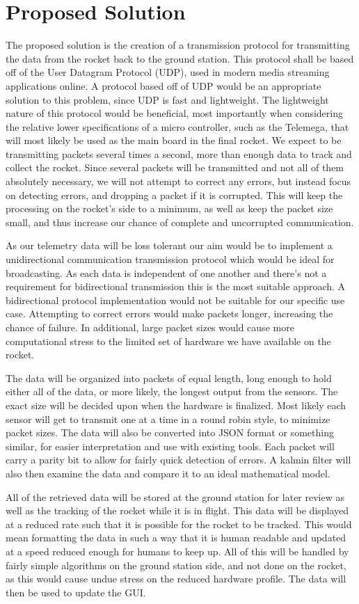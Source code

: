 \documentclass[onecolumn, draftclsnofoot,10pt, compsoc]{IEEEtran}
\begin{document}
\section{Proposed Solution}
The proposed solution is the creation of a transmission protocol for transmitting the data from the rocket back to the ground station. This protocol shall be based off of the User Datagram Protocol (UDP), used in modern media streaming applications online. A protocol based off of UDP would be an appropriate solution to this problem, since UDP is fast and lightweight. The lightweight nature of this protocol would be beneficial, most importantly when considering the relative lower specifications of a micro controller, such as the Telemega, that will most likely be used as the main board in the final rocket. We expect to be transmitting packets several times a second, more than enough data to track and collect the rocket. Since several packets will be transmitted and not all of them absolutely necessary, we will not attempt to correct any errors, but instead focus on detecting errors, and dropping a packet if it is corrupted. This will keep the processing on the rocket’s side to a minimum, as well as keep the packet size small, and thus increase our chance of complete and uncorrupted communication.  \par
As our telemetry data will be loss tolerant our aim would be to implement a unidirectional communication transmission protocol which would be ideal for broadcasting. As each data is independent of one another and there's not a requirement for bidirectional transmission this is the most suitable approach. A bidirectional protocol implementation would not be suitable for our specific use case.  Attempting to correct errors would make packets longer, increasing the chance of failure. In additional, large packet sizes would cause more computational stress to the limited set of hardware we have available on the rocket.
\par The data will be organized into packets of equal length, long enough to hold either all of the data, or more likely, the longest output from the sensors. The exact size will be decided upon when the hardware is finalized. Most likely each sensor will get to transmit one at a time in a round robin style, to minimize packet sizes. The data will also be converted into JSON format or something similar, for easier interpretation and use with existing tools. Each packet will carry a parity bit to allow for fairly quick detection of errors. A kalmin filter will also then examine the data and compare it to an ideal mathematical model. \par 
All of the retrieved data will be stored at the ground station for later review as well as the tracking of the rocket while it is in flight. This data will be displayed at a reduced rate such that it is possible for the rocket to be tracked. This would mean formatting the data in such a way that it is human readable and updated at a speed reduced enough for humans to keep up. All of this will be handled by fairly simple algorithms on the ground station side, and not done on the rocket, as this would cause undue stress on the reduced hardware profile. The data will then be used to update the GUI. \par
\end{document}
